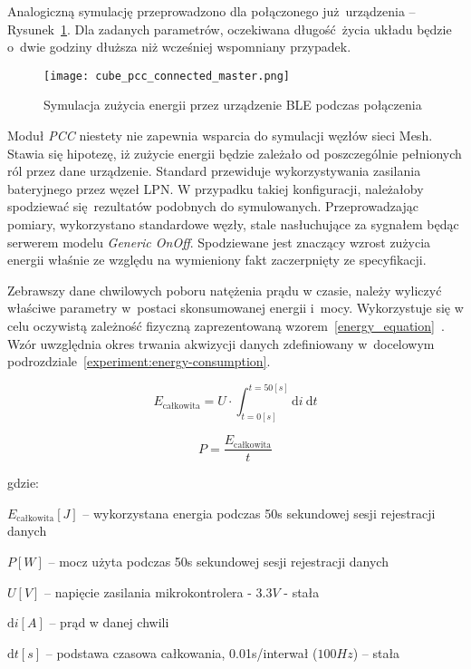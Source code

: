 Analogiczną symulację przeprowadzono dla połączonego już urządzenia -- Rysunek~\ref{rys:cube_pcc_connected_master}.
Dla zadanych parametrów, oczekiwana długość życia układu będzie o~dwie godziny dłuższa niż wcześniej wspomniany
przypadek.

\begin{figure}[!ht]
	\centering \texttt{[image: cube\_pcc\_connected\_master.png]} 
	\caption{Symulacja zużycia energii przez urządzenie \gls{BLE} podczas połączenia}
	\label{rys:cube_pcc_connected_master}
\end{figure}

Moduł \textit{PCC} niestety nie zapewnia wsparcia do symulacji węzłów sieci Mesh. Stawia się hipotezę,
iż zużycie energii będzie zależało od poszczególnie pełnionych ról przez dane urządzenie. Standard
przewiduje wykorzystywania zasilania bateryjnego przez węzeł \gls{LPN}. W przypadku takiej konfiguracji,
należałoby spodziewać się rezultatów podobnych do symulowanych. Przeprowadzając pomiary, wykorzystano
standardowe węzły, stale nasłuchujące za sygnałem będąc serwerem modelu \textit{Generic OnOff}. Spodziewane
jest znaczący wzrost zużycia energii właśnie ze względu na wymieniony fakt zaczerpnięty ze specyfikacji.

Zebrawszy dane chwilowych poboru natężenia prądu w czasie, należy wyliczyć właściwe parametry w~postaci
skonsumowanej energii i~mocy. Wykorzystuje się w celu oczywistą zależność fizyczną zaprezentowaną
wzorem~\ref{energy_equation}~\cite{skoro_marta_fizyka_1973}. Wzór uwzględnia okres trwania akwizycji danych
zdefiniowany w~docelowym podrozdziale~\ref{experiment:energy-consumption}.

\begin{equation} \label{energy_equation}
E_{\text{całkowita}} = U \cdot \int_{t=0[s]}^{t=50[s]} \mathrm{d}i \: \mathrm{d} t
\end{equation}

\begin{equation} \label{power_equation}
P = \frac{E_{\text{całkowita}}}{t}
\end{equation}

gdzie:

\begin{description}
\item $E_{\text{całkowita}} [J]$ -- wykorzystana energia podczas 50s sekundowej sesji rejestracji danych
\item $P [W]$ -- mocz użyta podczas 50s sekundowej sesji rejestracji danych
\item $U [V]$ -- napięcie zasilania mikrokontrolera - $3.3V$ - stała
\item $\mathrm{d}i [A]$ -- prąd w danej chwili
\item $\mathrm{d}t [s]$ -- podstawa czasowa całkowania, 0.01s/interwał ($100Hz$) -- stała 
\end{description}

